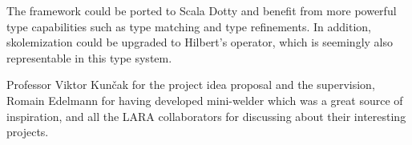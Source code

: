 \documentclass[acmlarge]{acmart}
\begin{document}
The framework could be ported to Scala Dotty and benefit from more powerful type capabilities such as type matching and type refinements. In addition, skolemization could be upgraded to Hilbert's operator, which is seemingly also representable in this type system.

\begin{acks}
Professor Viktor Kunčak for the project idea proposal and the supervision, Romain Edelmann for having developed mini-welder which was a great source of inspiration, and all the LARA collaborators for discussing about their interesting projects.
\end{acks}



\end{document}
